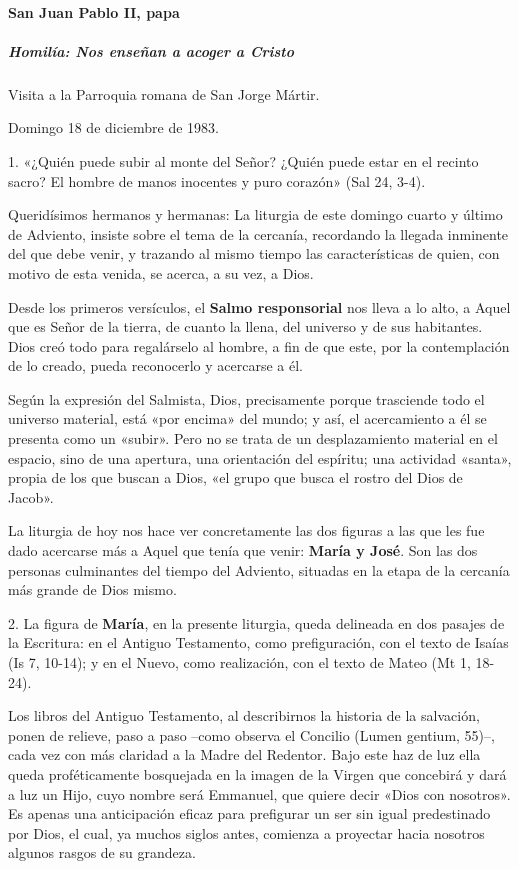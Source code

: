 \documentclass[]{article}
\let\oldparagraph\paragraph
\renewcommand{\paragraph}[1]{\oldparagraph{#1}\mbox{}}
\let\oldsubparagraph\subparagraph
\renewcommand{\subparagraph}[1]{\oldsubparagraph{#1}\mbox{}}
\begin{document}
\paragraph{San Juan Pablo II, papa}\label{san-juan-pablo-ii-papa-3}

\subparagraph{Homilía: Nos enseñan a acoger a
Cristo}\label{homiluxeda-nos-enseuxf1an-a-acoger-a-cristo}

Visita a la Parroquia romana de San Jorge Mártir.

Domingo 18 de diciembre de 1983.

1. «¿Quién puede subir al monte del Señor? ¿Quién puede estar en el
recinto sacro? El hombre de manos inocentes y puro corazón» (Sal 24,
3-4).

Queridísimos hermanos y hermanas: La liturgia de este domingo cuarto y
último de Adviento, insiste sobre el tema de la cercanía, recordando la
llegada inminente del que debe venir, y trazando al mismo tiempo las
características de quien, con motivo de esta venida, se acerca, a su
vez, a Dios.

Desde los primeros versículos, el \textbf{Salmo responsorial} nos lleva
a lo alto, a Aquel que es Señor de la tierra, de cuanto la llena, del
universo y de sus habitantes. Dios creó todo para regalárselo al hombre,
a fin de que este, por la contemplación de lo creado, pueda reconocerlo
y acercarse a él.

Según la expresión del Salmista, Dios, precisamente porque trasciende
todo el universo material, está «por encima» del mundo; y así, el
acercamiento a él se presenta como un «subir». Pero no se trata de un
desplazamiento material en el espacio, sino de una apertura, una
orientación del espíritu; una actividad «santa», propia de los que
buscan a Dios, «el grupo que busca el rostro del Dios de Jacob».

La liturgia de hoy nos hace ver concretamente las dos figuras a las que
les fue dado acercarse más a Aquel que tenía que venir: \textbf{María y
José}. Son las dos personas culminantes del tiempo del Adviento,
situadas en la etapa de la cercanía más grande de Dios mismo.

2. La figura de \textbf{María}, en la presente liturgia, queda delineada
en dos pasajes de la Escritura: en el Antiguo Testamento, como
prefiguración, con el texto de Isaías (Is 7, 10-14); y en el Nuevo, como
realización, con el texto de Mateo (Mt 1, 18-24).

Los libros del Antiguo Testamento, al describirnos la historia de la
salvación, ponen de relieve, paso a paso --como observa el Concilio
(Lumen gentium, 55)--, cada vez con más claridad a la Madre del
Redentor. Bajo este haz de luz ella queda proféticamente bosquejada en
la imagen de la Virgen que concebirá y dará a luz un Hijo, cuyo nombre
será Emmanuel, que quiere decir «Dios con nosotros». Es apenas una
anticipación eficaz para prefigurar un ser sin igual predestinado por
Dios, el cual, ya muchos siglos antes, comienza a proyectar hacia
nosotros algunos rasgos de su grandeza.
\end{document}
